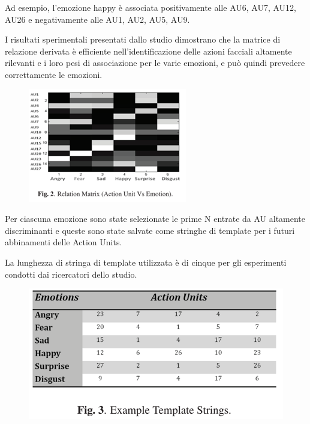 Ad esempio, l'emozione happy è associata positivamente alle AU6, AU7, AU12, AU26 e negativamente alle AU1, AU2, AU5, AU9. 

I risultati sperimentali presentati dallo studio dimostrano che la matrice di relazione derivata è efficiente nell'identificazione delle azioni facciali altamente rilevanti e i loro pesi di associazione per le varie emozioni, e può quindi prevedere correttamente le emozioni.
\begin{figure}
    \begin{center}    
        \includegraphics[width=0.7\linewidth]{images/19.png}
    \end{center}
\end{figure}

Per ciascuna emozione sono state selezionate le prime N entrate da AU altamente discriminanti e queste sono state salvate come stringhe di template per i futuri abbinamenti delle Action Units. 

La lunghezza di stringa di template utilizzata è di cinque per gli esperimenti condotti dai ricercatori dello studio.\newpage
\begin{figure}
    \begin{center}    
        \includegraphics[width=0.9\linewidth]{images/20.png}
    \end{center}
\end{figure}

